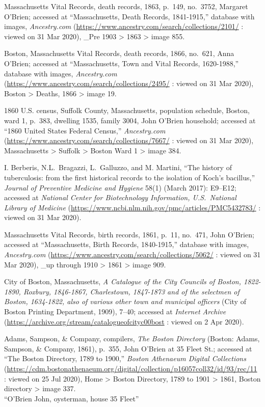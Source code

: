 \begin{thebibliography}{999}
	Massachusetts Vital Records, death records, 1863, p.\ 149, no.\ 3752, Margaret O'Brien; accessed at ``Massachusetts, Death Records, 1841-1915,'' database with images, \textit{Ancestry.com} (\url{https://www.ancestry.com/search/collections/2101/} : viewed on 31 Mar 2020), \_Pre 1903 > 1863 > image 855.
	
	Boston, Massachusetts Vital Records, death records, 1866, no.\ 621, Anna O'Brien; accessed at ``Massachusetts, Town and Vital Records, 1620-1988,'' database with images, \textit{Ancestry.com} (\url{https://www.ancestry.com/search/collections/2495/} : viewed on 31 Mar 2020), Boston > Deaths, 1866 > image 19.
	
	1860 U.S. census, Suffolk County, Massachusetts, population schedule, Boston, ward 1, p.\ 383, dwelling 1535, family 3004, John O'Brien household; accessed at ``1860 United States Federal Census,'' \textit{Ancestry.com} (\url{https://www.ancestry.com/search/collections/7667/} : viewed on 31 Mar 2020), Massachusetts > Suffolk > Boston Ward 1 > image 384.
	
	I. Berberis, N.L.\ Bragazzi, L.\ Galluzzo, and M. Martini, ``The history of tuberculosis: from the first historical records to the isolation of Koch's bacillus,'' \textit{Journal of Preventive Medicine and Hygiene} 58(1) (March 2017): E9--E12; accessed at \textit{National Center for Biotechnology Information, U.S.\ National Library of Medicine} (\url{https://www.ncbi.nlm.nih.gov/pmc/articles/PMC5432783/} : viewed on 31 Mar 2020).
	
	Massachusetts Vital Records, birth records, 1861, p.\ 11, no.\ 471, John O'Brien; accessed at ``Massachusetts, Birth Records, 1840-1915,'' database with images, \textit{Ancestry.com} (\url{https://www.ancestry.com/search/collections/5062/} : viewed on 31 Mar 2020), \_up through 1910 > 1861 > image 909.
	
	City of Boston, Massachusetts, \textit{A Catalogue of the City Councils of Boston, 1822-1890, Roxbury, 1846-1867, Charlestown, 1847-1873 and of the selectmen of Boston, 1634-1822, also of various other town and municipal officers} (City of Boston Printing Department, 1909), 7--40; accessed at \textit{Internet Archive} (\url{https://archive.org/stream/catalogueofcityc00bost} : viewed on 2 Apr 2020).
	
	Adams, Sampson, \& Company, compilers, \textit{The Boston Directory} (Boston: Adams, Sampson, \& Company, 1861), p.\ 355, John O'Brien at 35 Fleet St.; accessed at ``The Boston Directory, 1789 to 1900,'' \textit{Boston Athenaeum Digital Collections} (\url{https://cdm.bostonathenaeum.org/digital/collection/p16057coll32/id/93/rec/11} : viewed on 25 Jul 2020), Home > Boston Directory, 1789 to 1901 > 1861, Boston directory > image 337.\\
	``O'Brien John, oysterman, house 35 Fleet''
	

\end{thebibliography}
